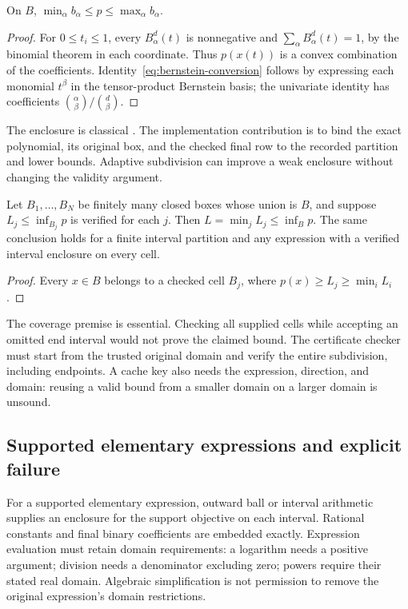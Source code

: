 \begin{lemma}\label{lem:bernstein}
On $B$, $\min_\alpha b_\alpha\le p\le\max_\alpha b_\alpha$.
\end{lemma}
\begin{proof}
For $0\le t_i\le1$, every $B_\alpha^d(t)$ is nonnegative and
$\sum_\alpha B_\alpha^d(t)=1$, by the binomial theorem in each
coordinate. Thus $p(x(t))$ is a convex combination of the coefficients.
Identity~\eqref{eq:bernstein-conversion} follows by expressing each
monomial $t^\beta$ in the tensor-product Bernstein basis; the univariate
identity has coefficients $\binom{\alpha}{\beta}/\binom d\beta$.
\end{proof}

The enclosure is classical
\cite{GarloffSmith2008,GarloffJanssonSmith2003}. The implementation contribution is to bind
the exact polynomial, its original box, and the checked final row to
the recorded partition and lower bounds. Adaptive subdivision can
improve a weak enclosure without changing the validity argument.

\begin{proposition}\label{prop:partition}
Let $B_1,\ldots,B_N$ be finitely many closed boxes whose union is $B$,
and suppose $L_j\le\inf_{B_j}p$ is verified for each $j$. Then
$L=\min_jL_j\le\inf_Bp$. The same conclusion holds for a finite interval
partition and any expression with a verified interval enclosure on every
cell.
\end{proposition}
\begin{proof}
Every $x\in B$ belongs to a checked cell $B_j$, where
$p(x)\ge L_j\ge\min_iL_i$.
\end{proof}

The coverage premise is essential. Checking all supplied cells while
accepting an omitted end interval would not prove the claimed bound.
The certificate checker must start from the trusted original domain and
verify the entire subdivision, including endpoints. A cache key also
needs the expression, direction, and domain: reusing a valid bound from a
smaller domain on a larger domain is unsound.

\subsection{Supported elementary expressions and explicit failure}

For a supported elementary expression, outward ball or interval
arithmetic supplies an enclosure for the support objective on each
interval. Rational constants and final binary coefficients are embedded
exactly. Expression evaluation must retain domain requirements: a
logarithm needs a positive argument; division needs a denominator
excluding zero; powers require their stated real domain. Algebraic
simplification is not permission to remove the original expression's
domain restrictions.

